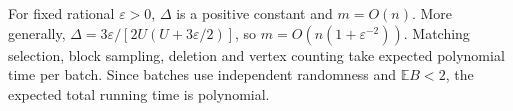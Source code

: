 \documentclass[10pt,a4paper]{article}
\newcommand{\E}{\mathbb E}
\begin{document}
For fixed rational \(\varepsilon>0\), \(\Delta\) is a positive constant and \(m=O(n)\). More generally, \(\Delta=3\varepsilon/[2U(U+3\varepsilon/2)]\), so \(m=O(n(1+\varepsilon^{-2}))\). Matching selection, block sampling, deletion and vertex counting take
expected polynomial time per batch. Since batches use independent
randomness and $\E B<2$, the expected total running time is polynomial.
\end{document}
